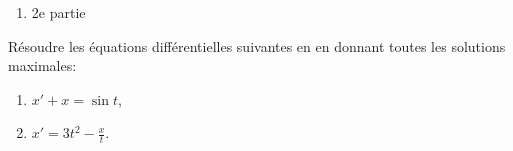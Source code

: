 {\begin{nntd-sol}[]
\begin{enumerate}
			\(\triangleright\) Les solutions de l'équation s'écrivent comme somme de la
			solution particulière et des solutions de l'équation homogène, soit ici:
			\begin{equation*}
				x(t)= x_h(t) + x_p(t) = \lambda e^{2t} + \frac12t^2e^{2t}
			\end{equation*}

			\item 2e partie
		\end{enumerate}
	\end{nntd-sol}
}{}

\begin{td-exo}[] %
	Résoudre les équations différentielles suivantes en en donnant toutes les 
	solutions maximales:
	\begin{enumerate}
		\item \(x'+x=\sin t\),
		\item \(x'=3t^2-\frac xt\).
	\end{enumerate}
\end{td-exo}

